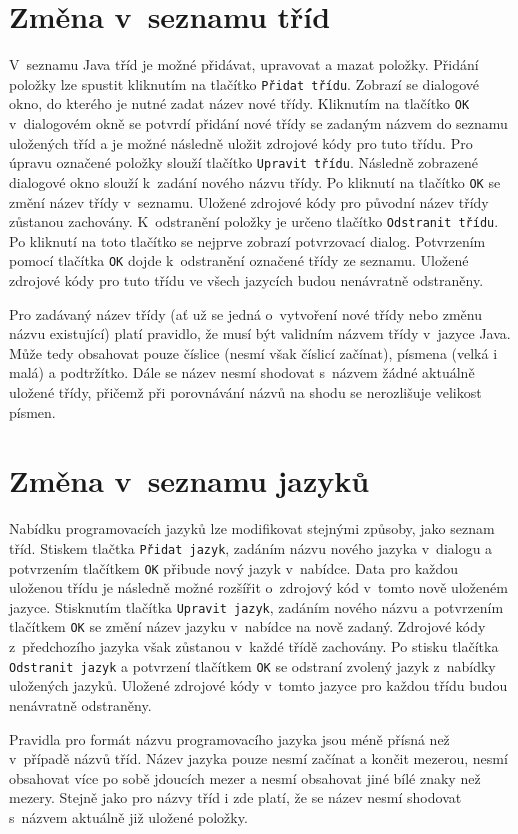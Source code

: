 \documentclass[czech,BP]{thesiskiv}
\begin{document}
\section{Změna v~seznamu tříd}
V~seznamu Java tříd je možné přidávat, upravovat a mazat položky. Přidání položky lze spustit kliknutím na tlačítko \texttt{Přidat třídu}. Zobrazí se dialogové okno, do kterého je nutné zadat název nové třídy. Kliknutím na tlačítko \texttt{OK} v~dialogovém okně se potvrdí přidání nové třídy se zadaným názvem do seznamu uložených tříd a je možné následně uložit zdrojové kódy pro tuto třídu. Pro úpravu označené položky slouží tlačítko \texttt{Upravit třídu}. Následně zobrazené dialogové okno slouží k~zadání nového názvu třídy. Po kliknutí na tlačítko \texttt{OK} se změní název třídy v~seznamu. Uložené zdrojové kódy pro původní název třídy zůstanou zachovány. K~odstranění položky je určeno tlačítko \texttt{Odstranit třídu}. Po kliknutí na toto tlačítko se nejprve zobrazí potvrzovací dialog. Potvrzením pomocí tlačítka \texttt{OK} dojde k~odstranění označené třídy ze seznamu. Uložené zdrojové kódy pro tuto třídu ve všech jazycích budou nenávratně odstraněny.\par
Pro zadávaný název třídy (ať už se jedná o~vytvoření nové třídy nebo změnu názvu existující) platí pravidlo, že musí být validním názvem třídy v~jazyce Java. Může tedy obsahovat pouze číslice (nesmí však číslicí začínat), písmena (velká i malá) a podtržítko. Dále se název nesmí shodovat s~názvem žádné aktuálně uložené třídy, přičemž při porovnávání názvů na shodu se nerozlišuje velikost písmen.

\section{Změna v~seznamu jazyků}
Nabídku programovacích jazyků lze modifikovat stejnými způsoby, jako seznam tříd. Stiskem tlačtka \texttt{Přidat jazyk}, zadáním názvu nového jazyka v~dialogu a potvrzením tlačítkem \texttt{OK} přibude nový jazyk v~nabídce. Data pro každou uloženou třídu je následně možné rozšířit o~zdrojový kód v~tomto nově uloženém jazyce. Stisknutím tlačítka \texttt{Upravit jazyk}, zadáním nového názvu a potvrzením tlačítkem \texttt{OK} se změní název jazyku v~nabídce na nově zadaný. Zdrojové kódy z~předchozího jazyka však zůstanou v~každé třídě zachovány. Po stisku tlačítka \texttt{Odstranit jazyk} a potvrzení tlačítkem \texttt{OK} se odstraní zvolený jazyk z~nabídky uložených jazyků. Uložené zdrojové kódy v~tomto jazyce pro každou třídu budou nenávratně odstraněny.\par
Pravidla pro formát názvu programovacího jazyka jsou méně přísná než v~případě názvů tříd. Název jazyka pouze nesmí začínat a končit mezerou, nesmí obsahovat více po sobě jdoucích mezer a nesmí obsahovat jiné bílé znaky než mezery. Stejně jako pro názvy tříd i zde platí, že se název nesmí shodovat s~názvem aktuálně již uložené položky.
\end{document}
